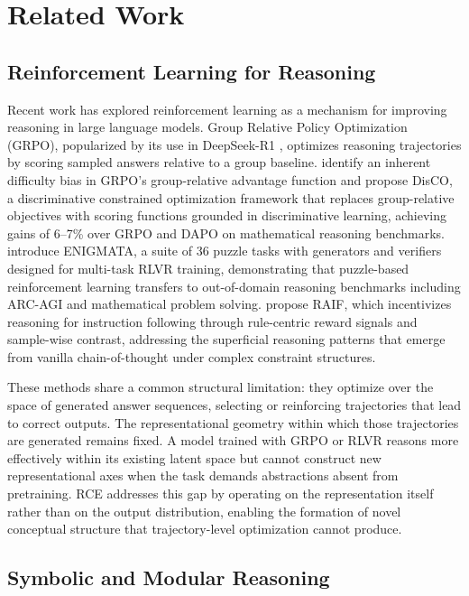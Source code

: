 \documentclass[11pt]{article}
\begin{document}
\section{Related Work}

\subsection{Reinforcement Learning for Reasoning}

Recent work has explored reinforcement learning as a mechanism for improving reasoning in large language models. Group Relative Policy Optimization (GRPO), popularized by its use in DeepSeek-R1 \cite{shao2024deepseekmath}, optimizes reasoning trajectories by scoring sampled answers relative to a group baseline. \citet{zhang2025disco} identify an inherent difficulty bias in GRPO's group-relative advantage function and propose DisCO, a discriminative constrained optimization framework that replaces group-relative objectives with scoring functions grounded in discriminative learning, achieving gains of 6--7\% over GRPO and DAPO on mathematical reasoning benchmarks. \citet{ye2025enigmata} introduce ENIGMATA, a suite of 36 puzzle tasks with generators and verifiers designed for multi-task RLVR training, demonstrating that puzzle-based reinforcement learning transfers to out-of-domain reasoning benchmarks including ARC-AGI and mathematical problem solving. \citet{qu2025raif} propose RAIF, which incentivizes reasoning for instruction following through rule-centric reward signals and sample-wise contrast, addressing the superficial reasoning patterns that emerge from vanilla chain-of-thought under complex constraint structures.

These methods share a common structural limitation: they optimize over the space of generated answer sequences, selecting or reinforcing trajectories that lead to correct outputs. The representational geometry within which those trajectories are generated remains fixed. A model trained with GRPO or RLVR reasons more effectively within its existing latent space but cannot construct new representational axes when the task demands abstractions absent from pretraining. RCE addresses this gap by operating on the representation itself rather than on the output distribution, enabling the formation of novel conceptual structure that trajectory-level optimization cannot produce.

\subsection{Symbolic and Modular Reasoning}
\end{document}

